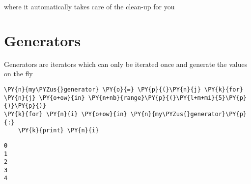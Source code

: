 where it automatically takes care of the clean-up for you


    \section{Generators}


    Generators are iterators which can only be iterated once and generate
the values on the fly


{\par%
\vspace{-1\baselineskip}%
}%
\begin{notebookcell}[52]%
\begin{addmargin}[\cellleftmargin]{0em}%
{\smaller%
\par%
%
\vspace{-1\smallerfontscale}%
\begin{Verbatim}[commandchars=\\\{\}]
\PY{n}{my\PYZus{}generator} \PY{o}{=} \PY{p}{(}\PY{n}{j} \PY{k}{for} \PY{n}{j} \PY{o+ow}{in} \PY{n+nb}{range}\PY{p}{(}\PY{l+m+mi}{5}\PY{p}{)}\PY{p}{)}
\PY{k}{for} \PY{n}{i} \PY{o+ow}{in} \PY{n}{my\PYZus{}generator}\PY{p}{:}
    \PY{k}{print} \PY{n}{i}
\end{Verbatim}
%
\par%
\vspace{-1\smallerfontscale}}%
\end{addmargin}
\end{notebookcell}

\par\vspace{1\smallerfontscale}%
    \begin{addmargin}[\cellleftmargin]{0em}%
    {\smaller%
    \vspace{-1\smallerfontscale}%
    
    \begin{Verbatim}[commandchars=\\\{\}]
0
1
2
3
4
    \end{Verbatim}
}%
    \end{addmargin}%

